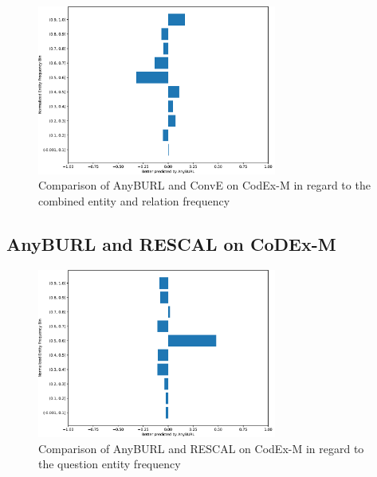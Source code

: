 \begin{figure}[H]
\centering
\includegraphics[width=0.7\textwidth]{images/combined_freq_anyburl_conve_codex.PNG}
\caption{Comparison of AnyBURL and ConvE on CodEx-M in regard to the combined entity and relation frequency}
\label{fig:combined_freq_anyburl_conve_codex}
\end{figure}



\subsection{AnyBURL and RESCAL on CoDEx-M}

\begin{figure}[H]
\centering
\includegraphics[width=0.7\textwidth]{images/entity_freq_question_anyburl_rescal_codex.PNG}
\caption{Comparison of AnyBURL and RESCAL on CodEx-M in regard to the question entity frequency}
\label{fig:entity_question_tail_anyburl_rescal_codex}
\end{figure}

